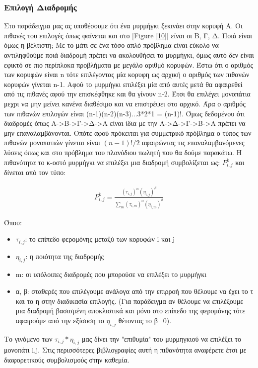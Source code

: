 \subsubsection{Επιλογή Διαδρομής}
Στο παράδειγμα μας ας υποθέσουμε ότι ένα μυρμήγκι ξεκινάει στην κορυφή Α. Οι πιθανές του επιλογές όπως φαίνεται και στο [Figure \ref{10}] είναι οι Β, Γ, Δ. Ποιά είναι όμως η βέλτιστη; 
Με το μάτι σε ένα τόσο απλό πρόβλημα είναι εύκολο να αντιληφθούμε ποιά διαδρομή πρέπει να ακολουθήσει το μυρμήγκι, όμως αυτό δεν είναι εφικτό σε πιο περίπλοκα προβλήματα με μεγάλο αριθμό κορυφών. Έστω ότι ο αριθμός των κορυφών είναι n τότε επιλέγοντας μία κορυφη ως αρχική ο αριθμός των πιθανών κορυφών γίνεται n-1. Αφού το μυρμήγκι επιλέξει μία από αυτές μετά θα αφαιρεθεί από τις πιθανές αφού την επισκέφθηκε και θα γίνουν n-2. Έτσι θα επιλέγει μονοπάτια μεχρι να μην μείνει κανένα διαθέσιμο και να επιστρέψει στο αρχικό. Άρα ο αριθμός των πιθανών επιλογών είναι (n-1)(n-2)(n-3)...3*2*1 = (n-1)!. Όμως δεδομένου ότι διαδρομές όπως Α->Β->Γ->Δ->Α είναι ίδια με την Α->Δ->Γ->Β->Α πρέπει να μην επαναλαμβάνονται. Οπότε αφού πρόκειται για συμμετρικό πρόβλημα ο τύπος των πιθανών μονοπατιών γίνεται είναι $(n-1)!/2$ αφαιρώντας τις επαναλαμβανόμενες λύσεις όπως και στο πρόβλημα του πλανόδιου πωλητή που θα δούμε παρακάτω. 
Η πιθανότητα το κ-οστό μυρμήγκι να επιλέξει μια διαδρομή συμβολίζεται ως: $P^k_{i,j}$ και δίνεται από τον τύπο: \cite{chandrashekar2023hwacoa}

\begin{align} \label{eq:3}
	P^k_{i,j}=\frac{(τ_{i,j})^α(η_{i,j})^β}{\sum_{m}(τ_{i,m})^α(η_{i,m})^β}
\end{align}

Όπου: 
\begin{itemize}
    \item $τ_{i,j}$: το επίπεδο φερομόνης μεταξύ των κορυφών i και j
    \item $η_{i,j}$: η ποιότητα της διαδρομής
    \item m: οι υπόλοιπες διαδρομές που μπορούσε να επιλέξει το μυρμήγκι
    \item α, β: σταθερές που επιλέγουμε ανάλογα από την επιρροή που θέλουμε να έχει το τ και το η στην διαδικασία επιλογής. (Για παράδειγμα αν θέλουμε να επιλέξουμε μια διαδρομή βασισμένη αποκλιστικά και μόνο στο επίπεδο της φερομόνης τότε αφαιρούμε από την εξίσοση το $η_{i,j}$ θέτοντας το β=0).
\end{itemize}
Το γινόμενο των $τ_{i,j}*η_{i,j}$ μας δίνει την "επιθυμία" του μυρμηγκιού να επιλέξει το μονοπάτι i,j.
Στις περισσότερες βιβλιογραφίες αυτή η πιθανότητα αναφέρετε έτσι με διαφορετικούς συμβολισμούς στην καθεμία. 

